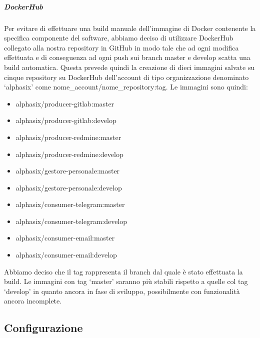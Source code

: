 			\subparagraph{DockerHub}\label{DockerHub}
			Per evitare di effettuare una build manuale dell'immagine di Docker contenente la specifica componente del software, abbiamo deciso di utilizzare DockerHub collegato alla nostra repository in GitHub in modo tale che ad ogni modifica effettuata e di conseguenza ad ogni push sui branch master e develop scatta una build automatica. Questa prevede quindi la creazione di dieci immagini salvate su cinque repository su DockerHub dell'account di tipo organizzazione denominato `alphasix' come nome\_account/nome\_repository:tag.
			Le immagini sono quindi:
			\begin{itemize}
				\item alphasix/producer-gitlab:master
				\item alphasix/producer-gitlab:develop
				\item alphasix/producer-redmine:master
				\item alphasix/producer-redmine:develop
				\item alphasix/gestore-personale:master
				\item alphasix/gestore-personale:develop
				\item alphasix/consumer-telegram:master
				\item alphasix/consumer-telegram:develop
				\item alphasix/consumer-email:master
				\item alphasix/consumer-email:develop
			\end{itemize}
			Abbiamo deciso che il tag rappresenta il branch dal quale è stato effettuata la build.
			Le immagini con tag `master' saranno più stabili rispetto a quelle col tag `develop' in quanto ancora in fase di sviluppo, possibilmente con funzionalità ancora incomplete.


	\subsection{Configurazione}\label{Configurazione}


